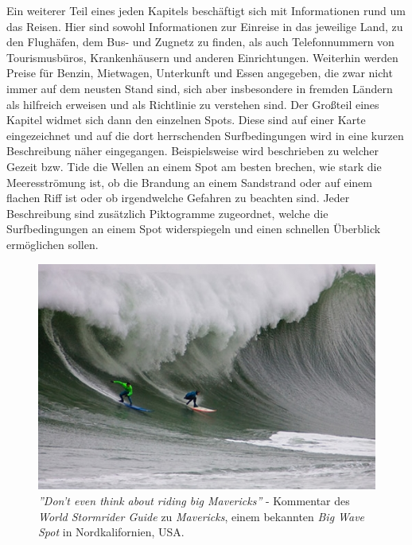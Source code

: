 Ein weiterer Teil eines jeden Kapitels beschäftigt sich mit
Informationen rund um das Reisen. Hier sind sowohl Informationen zur
Einreise in das jeweilige Land, zu den Flughäfen, dem Bus- und Zugnetz
zu finden, als auch Telefonnummern von Tourismusbüros, Krankenhäusern
und anderen Einrichtungen. Weiterhin werden Preise für Benzin,
Mietwagen, Unterkunft und Essen angegeben, die zwar nicht immer auf
dem neusten Stand sind, sich aber insbesondere in fremden Ländern als
hilfreich erweisen und als Richtlinie zu verstehen sind. Der Großteil
eines Kapitel widmet sich dann den einzelnen Spots. Diese sind auf
einer Karte eingezeichnet und auf die dort herrschenden
Surfbedingungen wird in eine kurzen Beschreibung näher
eingegangen. Beispielsweise wird beschrieben zu welcher Gezeit
bzw. Tide die Wellen an einem Spot am besten brechen, wie stark die
Meeresströmung ist, ob die Brandung an einem Sandstrand oder auf einem
flachen Riff ist oder ob irgendwelche Gefahren zu beachten sind. Jeder
Beschreibung sind zusätzlich Piktogramme zugeordnet, welche die
Surfbedingungen an einem Spot widerspiegeln und einen schnellen
Überblick ermöglichen sollen.

\begin{figure}[h]
  \includegraphics[width=\textwidth]{bilder/mavericks}
  \caption{\textit{''Don't even think about riding big Mavericks''} -
    Kommentar des \textit{World Stormrider Guide} zu
    \textit{Mavericks}, einem bekannten \textit{Big Wave Spot} in
    Nordkalifornien, USA.}
\end{figure}

